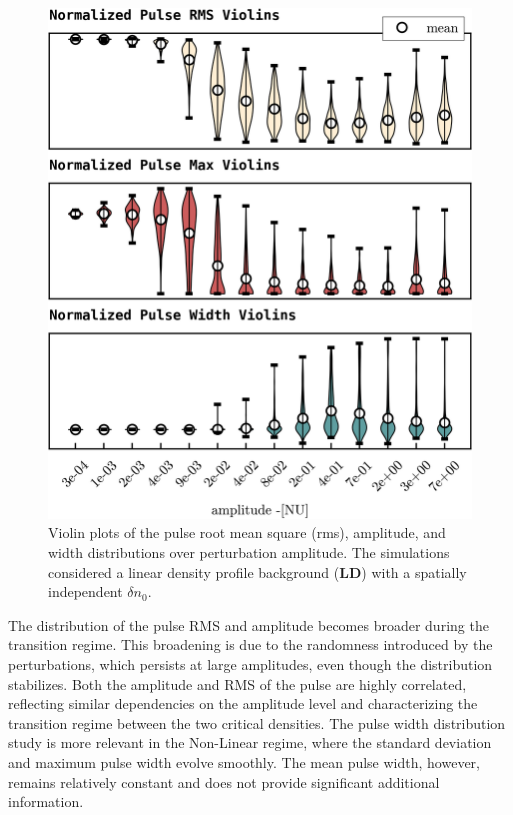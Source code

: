 \documentclass[11pt,a4paper,openany]{report}
\begin{document}
\begin{multicols}{2}
    \begin{figure}[H]
        \centering
        \includegraphics[width=1\linewidth]{./figures/pulse_overview.png}
        \caption{Violin plots of the pulse root mean square (rms), amplitude, and width distributions over perturbation amplitude. The simulations considered a linear density profile background (\textbf{LD}) with a spatially independent $\delta n_0$.}
        \label{fig:barrier}
    \end{figure}The distribution of the pulse RMS and amplitude becomes broader during the transition regime. This broadening is due to the randomness introduced by the perturbations, which persists at large amplitudes, even though the distribution stabilizes. Both the amplitude and RMS of the pulse are highly correlated, reflecting similar dependencies on the amplitude level and characterizing the transition regime between the two critical densities. The pulse width distribution study is more relevant in the Non-Linear regime, where the standard deviation and maximum pulse width evolve smoothly. The mean pulse width, however, remains relatively constant and does not provide significant additional information.


\end{multicols}
\end{document}
